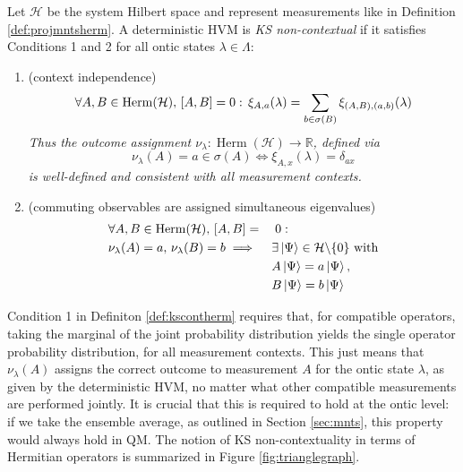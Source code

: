 \begin{definition}
\label{def:kscontherm}
Let $\mathcal{H}$ be the system Hilbert space and represent measurements like in Definition \ref{def:projmntsherm}. A deterministic HVM is \emph{KS non-contextual} if it satisfies Conditions 1 and 2 for all ontic states $\lambda\in\Lambda$:
\begin{enumerate}
    \item (context independence)
    \begin{equation*}
    \forall A,B\in\operatorname{Herm}(\mathcal{H}), \thinspace[A,B]=0: \thinspace\xi_{A,a}(\lambda)=\sum_{b\in\sigma(B)}\xi_{(A,B),(a,b)}(\lambda)    
    \end{equation*}
    {\small\emph{Thus the outcome assignment $\nu_{\lambda}:\operatorname{Herm}(\mathcal{H})\rightarrow\mathbb{\mathbb{R}}$, defined via \begin{equation*}
    \nu_{\lambda}(A)=a\in\sigma(A)\iff\xi_{A,x}(\lambda)=\delta_{ax} 
    \end{equation*} is well-defined and consistent with all measurement contexts.}}
    \item (commuting observables are assigned simultaneous eigenvalues)
    \begin{alignat*}{2}
    & \forall A,B\in\operatorname{Herm}(\mathcal{H}), \thinspace[A,B]= &&\; 0:\\&\nu_{\lambda}(A)=a,\thinspace \nu_{\lambda}(B)=b \implies && \exists\ket{\Psi} \in\mathcal{H}\backslash\{0\}\text{ with}\\& &&
    A\ket{\Psi} =a\ket{\Psi},\\ &
    && B\ket{\Psi} =b\ket{\Psi}
    \end{alignat*}
\end{enumerate}
\end{definition}

Condition 1 in Definiton \ref{def:kscontherm} requires that, for compatible operators, taking the marginal of the joint probability distribution yields the single operator probability distribution, for all measurement contexts. This just means that $\nu_\lambda(A)$ assigns the correct outcome to measurement $A$ for the ontic state $\lambda$, as given by the deterministic HVM, no matter what other compatible measurements are performed jointly. It is crucial that this is required to hold at the ontic level: if we take the ensemble average, as outlined in Section \ref{sec:mnts}, this property would always hold in QM. The notion of KS non-contextuality in terms of Hermitian operators is summarized in Figure \ref{fig:trianglegraph}.

